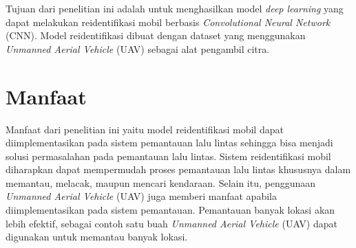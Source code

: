 Tujuan dari penelitian ini adalah untuk menghasilkan model \emph{deep learning} yang dapat melakukan reidentifikasi mobil berbasis \emph{Convolutional Neural Network} (CNN). Model reidentifikasi dibuat dengan dataset yang menggunakan \textit{Unmanned Aerial Vehicle} (UAV) sebagai alat pengambil citra.

\section{Manfaat}
\label{sec:Manfaat}

Manfaat dari penelitian ini yaitu model reidentifikasi mobil dapat diimplementasikan pada sistem pemantauan lalu lintas sehingga bisa menjadi solusi permasalahan pada pemantauan lalu lintas.  Sistem reidentifikasi mobil diharapkan dapat mempermudah proses pemantauan lalu lintas khususnya dalam memantau, melacak, maupun mencari kendaraan. Selain itu, penggunaan \emph{Unmanned Aerial Vehicle} (UAV) juga memberi manfaat apabila diimplementasikan pada sistem pemantauan. Pemantauan banyak lokasi akan lebih efektif, sebagai contoh satu buah \emph{Unmanned Aerial Vehicle} (UAV) dapat digunakan untuk memantau banyak lokasi.
